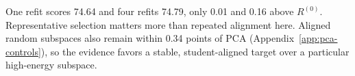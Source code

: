 One refit scores 74.64 and four refits 74.79, only 0.01 and 0.16 above
$R^{(0)}$. Representative selection matters more than repeated alignment here.
Aligned random subspaces also remain within 0.34 points of PCA
(Appendix~\ref{app:pca-controls}), so the evidence favors a stable,
student-aligned target over a particular high-energy subspace.

\FloatBarrier
